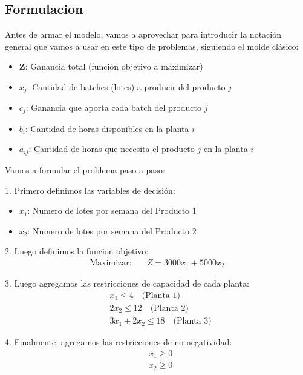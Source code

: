 \documentclass[12pt]{article}
\begin{document}
\subsection{Formulacion}

Antes de armar el modelo, vamos a aprovechar para introducir la notación general que vamos a usar en este tipo de problemas, siguiendo el molde clásico:

\begin{itemize}
    \item $\mathbf{Z}$: Ganancia total (función objetivo a maximizar)
    \item $x_j$: Cantidad de batches (lotes) a producir del producto $j$
    \item $c_j$: Ganancia que aporta cada batch del producto $j$
    \item $b_i$: Cantidad de horas disponibles en la planta $i$
    \item $a_{ij}$: Cantidad de horas que necesita el producto $j$ en la planta $i$
\end{itemize}

Vamos a formular el problema paso a paso:

\vspace{1em}

1. Primero definimos las variables de decisión:

\begin{itemize}
    \item $x_1$: Numero de lotes por semana del Producto 1
    \item $x_2$: Numero de lotes por semana del Producto 2
\end{itemize}

2. Luego definimos la funcion objetivo:
\begin{align*}
\text{Maximizar:} \quad & Z = 3000x_1 + 5000x_2
\end{align*}

3. Luego agregamos las restricciones de capacidad de cada planta:
\begin{align*}
& x_1 \leq 4 \quad \text{(Planta 1)} \\
& 2x_2 \leq 12 \quad \text{(Planta 2)} \\
& 3x_1 + 2x_2 \leq 18 \quad \text{(Planta 3)}
\end{align*}

4. Finalmente, agregamos las restricciones de no negatividad:
\begin{align*}
                       & x_1 \geq 0 \\
                       & x_2 \geq 0
\end{align*}
\end{document}
